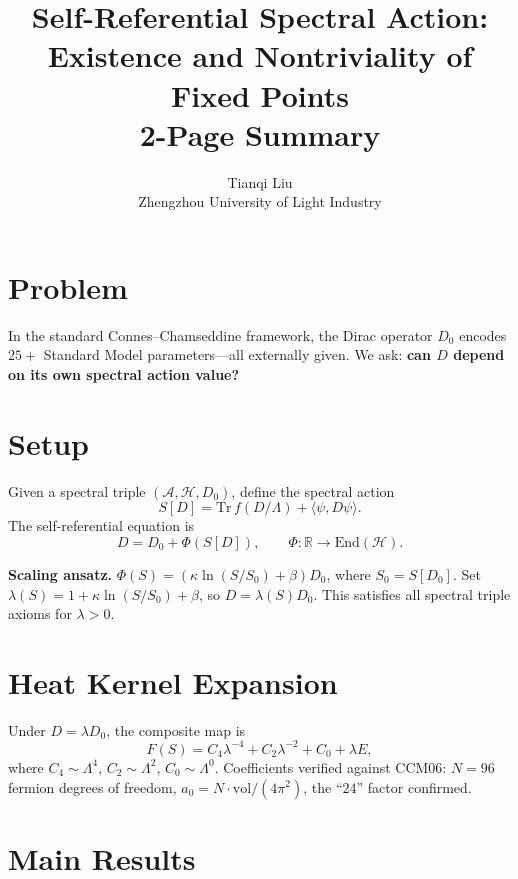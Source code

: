 ﻿\documentclass[11pt,a4paper]{article}
\begin{document}
\title{\textbf{Self-Referential Spectral Action:\\
Existence and Nontriviality of Fixed Points}\\[4pt]
\large 2-Page Summary}
\author{Tianqi Liu\\Zhengzhou University of Light Industry}
\date{}
\maketitle

\section*{Problem}

In the standard Connes--Chamseddine framework, the Dirac operator $D_0$ encodes $25+$ Standard Model parameters---all externally given. We ask: \textbf{can $D$ depend on its own spectral action value?}

\section*{Setup}

Given a spectral triple $(\mathcal{A}, \mathcal{H}, D_0)$, define the spectral action
\[
S[D] = \mathrm{Tr}\, f(D/\Lambda) + \langle\psi, D\psi\rangle.
\]
The self-referential equation is
\[
D = D_0 + \Phi(S[D]), \qquad \Phi: \mathbb{R} \to \mathrm{End}(\mathcal{H}).
\]

\noindent\textbf{Scaling ansatz.}
$\Phi(S) = (\kappa \ln(S/S_0) + \beta) D_0$, where $S_0 = S[D_0]$.
Set $\lambda(S)=1+\kappa\ln(S/S_0)+\beta$, so $D=\lambda(S)D_0$.
This satisfies all spectral triple axioms for $\lambda>0$.

\section*{Heat Kernel Expansion}

Under $D=\lambda D_0$, the composite map is
\[
F(S) = C_4\lambda^{-4} + C_2\lambda^{-2} + C_0 + \lambda E,
\]
where $C_4\sim\Lambda^4$, $C_2\sim\Lambda^2$, $C_0\sim\Lambda^0$.
Coefficients verified against CCM06: $N=96$ fermion degrees of freedom,
$a_0 = N\cdot\mathrm{vol}/(4\pi^2)$, the ``$24$'' factor confirmed.

\section*{Main Results}
\end{document}
